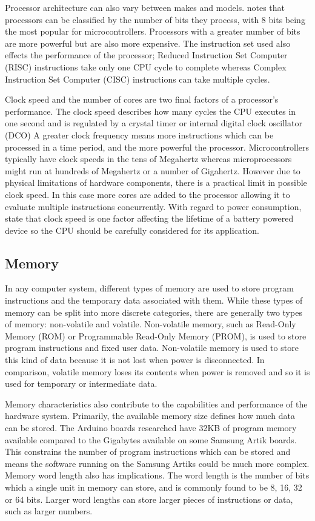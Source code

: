       Processor architecture can also vary between makes and models. \citep{microcontrollers:2011} notes that processors can be classified by the number of bits they process, with 8 bits being the most popular for microcontrollers. Processors with a greater number of bits are more powerful but are also more expensive. The instruction set used also effects the performance of the processor; Reduced Instruction Set Computer (RISC) instructions take only one CPU cycle to complete whereas Complex Instruction Set Computer (CISC) instructions can take multiple cycles.

      Clock speed and the number of cores are two final factors of a processor's performance. The clock speed describes how many cycles the CPU executes in one second and is regulated by a crystal timer or internal digital clock oscillator (DCO) A greater clock frequency means more instructions which can be processed in a time period, and the more powerful the processor. Microcontrollers typically have clock speeds in the tens of Megahertz whereas microprocessors might run at hundreds of Megahertz or a number of Gigahertz. However due to physical limitations of hardware components, there is a practical limit in possible clock speed. In this case more cores are added to the processor allowing it to evaluate multiple instructions concurrently. With regard to power consumption, \citet{wsnpower:2010} state that clock speed is one factor affecting the lifetime of a battery powered device so the CPU should be carefully considered for its application.

    \subsection{Memory}
      In any computer system, different types of memory are used to store program instructions and the temporary data associated with them. While these types of memory can be split into more discrete categories, there are generally two types of memory: non-volatile and volatile. Non-volatile memory, such as Read-Only Memory (ROM) or Programmable Read-Only Memory (PROM), is used to store program instructions and fixed user data. Non-volatile memory is used to store this kind of data because it is not lost when power is disconnected. In comparison, volatile memory loses its contents when power is removed and so it is used for temporary or intermediate data.

      Memory characteristics also contribute to the capabilities and performance of the hardware system. Primarily, the available memory size defines how much data can be stored. The Arduino boards researched have 32KB of program memory available compared to the Gigabytes available on some Samsung Artik boards. This constrains the number of program instructions which can be stored and means the software running on the Samsung Artiks could be much more complex. Memory word length also has implications. The word length is the number of bits which a single unit in memory can store, and is commonly found to be 8, 16, 32 or 64 bits. Larger word lengths can store larger pieces of instructions or data, such as larger numbers. 

